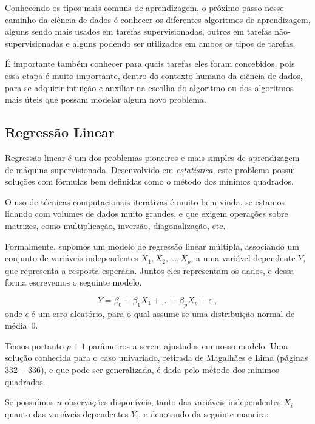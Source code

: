 Conhecendo os tipos mais comuns de aprendizagem, o próximo passo nesse caminho da ciência de dados é conhecer os diferentes algoritmos de aprendizagem, alguns sendo mais usados em tarefas supervisionadas, outros em tarefas não-supervisionadas e alguns podendo ser utilizados em ambos os tipos de tarefas.

É importante também conhecer para quais tarefas eles foram concebidos, pois essa etapa é muito importante, dentro do contexto humano da ciência de dados, para se adquirir intuição e auxiliar na escolha do algoritmo ou dos algoritmos mais úteis que possam modelar algum novo problema.

\subsection{Regressão Linear}

Regressão linear é um dos problemas pioneiros e mais simples de aprendizagem de máquina supervisionada. Desenvolvido em \emph{estatística}, este problema possui soluções com fórmulas bem definidas como o método dos mínimos quadrados.

O uso de técnicas computacionais iterativas é muito bem-vinda, se estamos lidando com volumes de dados muito grandes, e que exigem operações sobre matrizes, como multiplicação, inversão, diagonalização, etc.

Formalmente, supomos um modelo de regressão linear múltipla, associando um conjunto de variáveis independentes $X_1, X_2, \ldots, X_p$, a uma variável dependente $Y$, que representa a resposta esperada. Juntos eles representam os dados, e dessa forma escrevemos o seguinte modelo.

\begin{equation}\label{algo:1}
Y = \beta_0 + \beta_1 X_1 + \ldots + \beta_p X_p + \epsilon \; ,
\end{equation}
onde $\epsilon$ é um erro aleatório, para o qual assume-se uma distribuição normal de média~$0$.

Temos portanto $p{+}1$ parâmetros a serem ajustados em nosso modelo. Uma solução conhecida para o caso univariado, retirada de Magalhães e Lima \citep{antonio} (páginas $332{-}336$), e que pode ser generalizada, é dada pelo método dos mínimos quadrados. 

Se possuímos $n$ observações disponíveis, tanto das variáveis independentes $X_i$ quanto das variáveis dependentes $Y_i$, e denotando da seguinte maneira:

